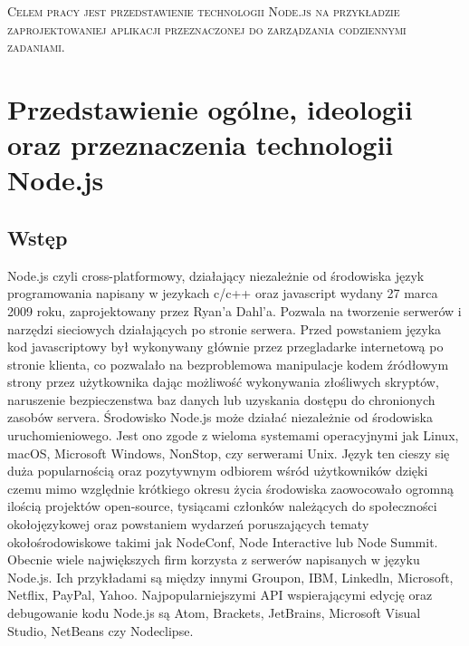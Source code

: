 \documentclass[12pt]{report}
\begin{document}
\begin{titlepage}
	\centering
	{\scshape\LARGE Celem pracy jest przedstawienie technologii Node.js na przykładzie zaprojektowaniej aplikacji przeznaczonej do zarządzania codziennymi zadaniami.  \par}
\end{titlepage}
\tableofcontents

\chapter{Przedstawienie ogólne, ideologii oraz przeznaczenia technologii Node.js}

\section{Wstęp}
Node.js czyli cross-platformowy, działający niezależnie od środowiska język programowania napisany w jezykach c/c++ oraz javascript wydany 27 marca 2009 roku, zaprojektowany przez Ryan’a Dahl’a. 
Pozwala na tworzenie serwerów i narzędzi sieciowych działających po stronie serwera. 
Przed powstaniem języka kod javascriptowy był wykonywany głównie przez przegladarke internetową po stronie klienta, co pozwalało na bezproblemowa manipulacje kodem źródłowym strony przez użytkownika dając możliwość wykonywania złośliwych skryptów, naruszenie bezpieczenstwa baz danych lub uzyskania dostępu do chronionych zasobów servera. 
Środowisko Node.js może działać niezależnie od środowiska uruchomieniowego. 
Jest ono zgode z wieloma systemami operacyjnymi jak  Linux, macOS, Microsoft Windows, NonStop, czy serwerami Unix. 
Język ten cieszy się duża popularnością oraz pozytywnym odbiorem wśród użytkowników dzięki czemu mimo względnie krótkiego okresu życia środowiska zaowocowało ogromną ilością projektów open-source, tysiącami członków należących do społeczności okołojęzykowej oraz powstaniem wydarzeń poruszających tematy okołośrodowiskowe takimi jak NodeConf, Node Interactive lub Node Summit. 
Obecnie wiele największych firm korzysta z serwerów napisanych w języku Node.js. 
Ich przykładami są między innymi Groupon, IBM, Linkedln, Microsoft, Netflix, PayPal, Yahoo. 
Najpopularniejszymi API wspierającymi edycję oraz debugowanie kodu Node.js są Atom, Brackets, JetBrains, Microsoft Visual Studio, NetBeans czy Nodeclipse.
\end{document}

